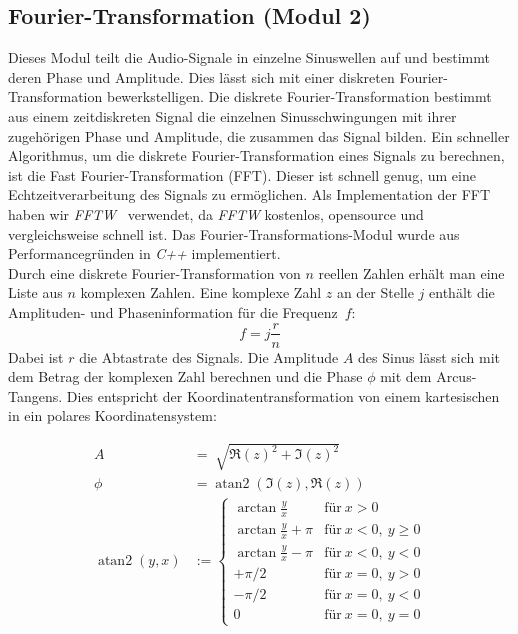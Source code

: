 \subsection{Fourier-Transformation (Modul 2)}
Dieses Modul teilt die Audio-Signale in einzelne Sinuswellen auf und bestimmt deren Phase und Amplitude. Dies lässt sich mit einer diskreten Fourier-Transformation bewerkstelligen. Die diskrete Fourier-Transformation bestimmt aus einem zeitdiskreten Signal die einzelnen Sinusschwingungen mit ihrer zugehörigen Phase und Amplitude, die zusammen das Signal bilden. Ein schneller Algorithmus, um die diskrete Fourier-Transformation eines Signals zu berechnen, ist die Fast Fourier-Transformation (FFT). Dieser ist schnell genug, um eine Echtzeitverarbeitung des Signals zu ermöglichen. Als Implementation der FFT haben wir \textit{FFTW}~\cite{FFTW} verwendet, da \textit{FFTW} kostenlos, opensource und vergleichsweise schnell ist.
Das Fourier-Transformations-Modul wurde aus Performancegründen in \textit{C++} implementiert.\\
Durch eine diskrete Fourier-Transformation von $n$ reellen Zahlen erhält man eine Liste aus $n$ komplexen Zahlen. Eine komplexe Zahl $z$ an der Stelle $j$ enthält die Amplituden- und Phaseninformation für die Frequenz~$f$:
\begin{equation}
f = j\frac{r}{n}
\end{equation}
Dabei ist $r$ die Abtastrate des Signals. Die Amplitude $A$ des Sinus lässt sich mit dem Betrag der komplexen Zahl berechnen und die Phase $\phi$ mit dem Arcus-Tangens. Dies entspricht der Koordinatentransformation von einem kartesischen in ein polares Koordinatensystem:\\
\begin{minipage}{0.49\textwidth}
   \begin{align}
    A &= \sqrt[]{{\Re(z)}^2 + {\Im(z)}^2}\\
    \phi &= \operatorname{atan2}(\Im(z), \Re(z))\\
    \operatorname{atan2}(y,x) &:= \begin{cases} \arctan\frac{y}{x} & \mathrm{für}\ x > 0\\ \arctan\frac{y}{x} + \pi & \mathrm{für}\ x < 0,\ y \geq 0\\ \arctan\frac{y}{x} - \pi & \mathrm{für}\ x < 0,\ y < 0\\ +\pi/2 & \mathrm{für}\ x = 0,\ y > 0\\ -\pi/2 & \mathrm{für}\ x = 0,\ y < 0\\ 0 & \mathrm{für}\ x = 0,\ y = 0 \end{cases}
    \end{align}
\end{minipage}
